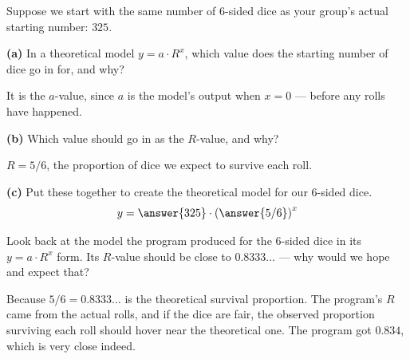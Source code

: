 \documentclass[12pt]{ximera}
\begin{document}
\begin{problem}
Suppose we start with the same number of 6-sided dice as your group's actual starting
number: $325$.

\begin{prompt}
\textbf{(a)} In a theoretical model $y = a \cdot R^{x}$, which value does the
starting number of dice go in for, and why?
\begin{freeResponse}
\end{freeResponse}
\begin{solution}
It is the $a$-value, since $a$ is the model's output when $x = 0$ --- before any
rolls have happened.
\end{solution}
\end{prompt}

\begin{prompt}
\textbf{(b)} Which value should go in as the $R$-value, and why?
\begin{freeResponse}
\end{freeResponse}
\begin{solution}
$R = 5/6$, the proportion of dice we expect to survive each roll.
\end{solution}
\end{prompt}

\begin{prompt}
\textbf{(c)} Put these together to create the theoretical model for our 6-sided dice.
\[
y = \answer{325} \cdot \left(\answer{5/6}\right)^{x}
\]
\end{prompt}
\end{problem}

\begin{problem}
Look back at the model the program produced for the 6-sided dice in its
$y = a \cdot R^{x}$ form. Its $R$-value should be close to $0.8333\ldots$ --- why
would we hope and expect that?

\begin{freeResponse}
\end{freeResponse}

\begin{solution}
Because $5/6 = 0.8333\ldots$ is the theoretical survival proportion. The program's
$R$ came from the actual rolls, and if the dice are fair, the observed proportion
surviving each roll should hover near the theoretical one. The program got $0.834$,
which is very close indeed.
\end{solution}
\end{problem}
\end{document}
